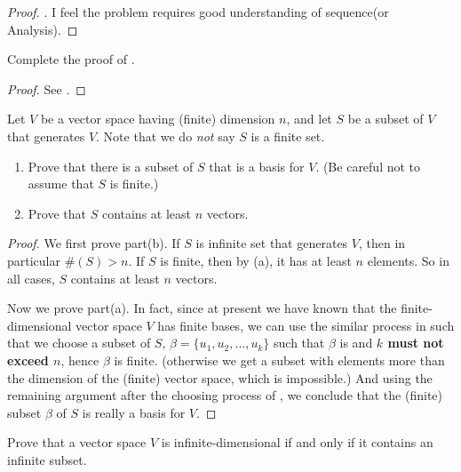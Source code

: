 \begin{proof}
\TODOREF {}.
I feel the problem requires good understanding of sequence(or Analysis).
\end{proof}

\begin{exercise} \label{exercise 1.6.19}
Complete the proof of .
\end{exercise}

\begin{proof}
See .
\end{proof}

\begin{exercise} \label{exercise 1.6.20}
Let \(V\) be a vector space having (finite) dimension \(n\), and let \(S\) be a subset of \(V\) that generates \(V\).
Note that we do \emph{not} say \(S\) is a finite set.
\begin{enumerate}
\item Prove that there is a subset of \(S\) that is a basis for \(V\). (Be careful not to assume that \(S\) is finite.)
\item Prove that \(S\) contains at least \(n\) vectors.
\end{enumerate}
\end{exercise}

\begin{proof}
We first prove part(b).
If \(S\) is infinite set that generates \(V\), then in particular \(\#(S) > n\).
If \(S\) is finite, then by (a), it has at least \(n\) elements.
So in all cases, \(S\) contains at least \(n\) vectors.

Now we prove part(a).
In fact, since at present we have known that the finite-dimensional vector space \(V\) has finite bases, we can use the similar process in  such that we choose a subset of \(S\), \(\beta = \{ u_1, u_2, ..., u_k \}\) such that \(\beta\) is \LID{} and \textbf{\(k\) must not exceed \(n\)}, hence \(\beta\) is finite.
(otherwise we get a \LID{} subset with elements more than the dimension of the (finite) vector space, which is impossible.)
And using the remaining argument after the choosing process of , we conclude that the (finite) \LID{} subset \(\beta\) of \(S\) is really a basis for \(V\).
\end{proof}

\begin{exercise} \label{exercise 1.6.21}
Prove that a vector space \(V\) is infinite-dimensional if and only if it contains an infinite \LID{} subset.
\end{exercise}

